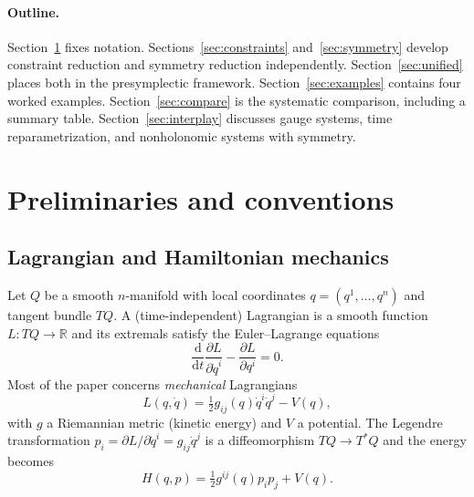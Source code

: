 \documentclass[11pt,a4paper]{article}
\numberwithin{equation}{section}
\theoremstyle{plain}
\theoremstyle{definition}
\theoremstyle{remark}
\newcommand{\R}{\mathbb{R}}
\newcommand{\dd}{\mathrm{d}}
\begin{document}
\paragraph{Outline.}
Section~\ref{sec:prelim} fixes notation. Sections~\ref{sec:constraints} and~\ref{sec:symmetry} develop constraint reduction and symmetry reduction independently. Section~\ref{sec:unified} places both in the presymplectic framework. Section~\ref{sec:examples} contains four worked examples. Section~\ref{sec:compare} is the systematic comparison, including a summary table. Section~\ref{sec:interplay} discusses gauge systems, time reparametrization, and nonholonomic systems with symmetry.

\section{Preliminaries and conventions}\label{sec:prelim}

\subsection{Lagrangian and Hamiltonian mechanics}

Let $Q$ be a smooth $n$-manifold with local coordinates $q=(q^1,\dots,q^n)$ and tangent bundle $TQ$. A (time-independent) Lagrangian is a smooth function $L:TQ\to\R$ and its extremals satisfy the Euler--Lagrange equations
\begin{equation}\label{eq:EL}
\frac{\dd}{\dd t}\frac{\partial L}{\partial \dot q^{i}}-\frac{\partial L}{\partial q^{i}}=0 .
\end{equation}
Most of the paper concerns \emph{mechanical} Lagrangians
\begin{equation}\label{eq:mechL}
L(q,\dot q)=\tfrac12 g_{ij}(q)\dot q^i\dot q^j-V(q),
\end{equation}
with $g$ a Riemannian metric (kinetic energy) and $V$ a potential. The Legendre transformation $p_i=\partial L/\partial\dot q^i=g_{ij}\dot q^j$ is a diffeomorphism $TQ\to T^*Q$ and the energy becomes
\begin{equation}\label{eq:mechH}
H(q,p)=\tfrac12 g^{ij}(q)p_ip_j+V(q).
\end{equation}
\end{document}
